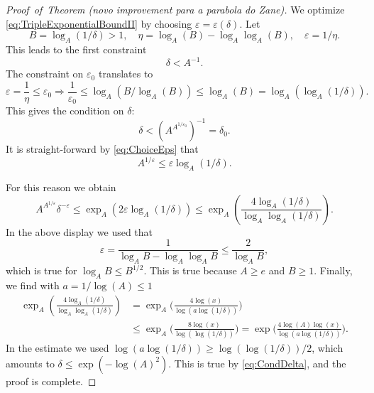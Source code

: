 \begin{proof}[Proof~of~Theorem (novo improvement para a parabola do Zane)]
We optimize \eqref{eq:TripleExponentialBoundII} by choosing $\varepsilon=\varepsilon(\delta)$. 
Let 
\begin{equation}
\label{eq:ChoiceEps}
B = \log_A(1/\delta) > 1, \quad \eta = \log_A (B) - \log_A \log_A(B), \quad \varepsilon = 1/\eta.
\end{equation}
 This leads to the first constraint
\begin{equation}
\label{eq:ConstraintI}
\delta < A^{-1}.
\end{equation}
The constraint on $\varepsilon_0$ translates to
\begin{equation*}
\varepsilon = \frac{1}{\eta} \leq \varepsilon_0 \Rightarrow \frac{1}{\varepsilon_0} \leq \log_A (B / \log_A (B)) \leq \log_A( B) = \log_A (\log_A (1/\delta)).
\end{equation*}
This gives the condition on $\delta$:
\begin{equation}
\label{eq:CondDelta}
\delta < (A^{A^{1/\varepsilon_0}})^{-1} = \delta_0.
\end{equation}
It is straight-forward by \eqref{eq:ChoiceEps} that
\begin{equation*}
A^{1/\varepsilon} \leq \varepsilon \log_A(1/\delta).
\end{equation*}

For this reason we obtain
\begin{equation*}
A^{A^{1/\varepsilon}} \delta^{-\varepsilon} \leq \exp_A (2 \varepsilon \log_A(1/\delta)) \leq \exp_A( \frac{4 \log_A(1/\delta)}{\log_A \log_A (1/\delta)}).
\end{equation*}
In the above display we used that
\begin{equation*}
\varepsilon = \frac{1}{\log_A B - \log_A \log_A B} \leq \frac{2}{\log_A B},
\end{equation*}
which is true for $\log_A B \leq B^{1/2}$. This is true because $A \geq e$ and $B \geq 1$.
Finally, we find with $a = 1/\log(A) \leq 1$ 
\begin{equation*}
\begin{split}
\exp_A( \frac{4 \log_A(1/\delta)}{\log_A \log_A (1/\delta)}) &= \exp_A \big( \frac{4 \log(x)}{\log( a \log(1/\delta))} \big) \\
&\leq \exp_A \big( \frac{8 \log(x)}{\log( \log(1/\delta))} \big) = \exp \big( \frac{4 \log(A) \log(x)}{\log( a \log(1/\delta))} \big).
\end{split}
\end{equation*}
In the estimate we used $\log(a \log(1/\delta)) \geq \log ( \log( 1/\delta))/2$, which amounts to $\delta \leq \exp( - \log(A)^2)$. This is true by \eqref{eq:CondDelta}, and the proof is complete.

\end{proof}
